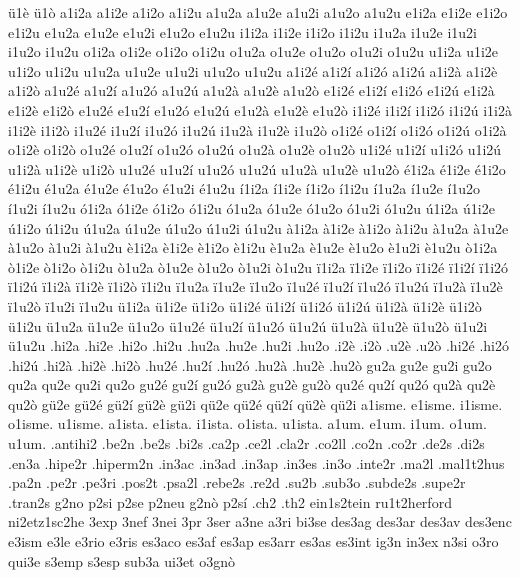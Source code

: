{ü1è ü1ò
%
a1i2a a1i2e a1i2o a1i2u
a1u2a a1u2e a1u2i a1u2o a1u2u
e1i2a e1i2e e1i2o e1i2u
e1u2a e1u2e e1u2i e1u2o e1u2u
i1i2a i1i2e i1i2o i1i2u
i1u2a i1u2e i1u2i i1u2o i1u2u
o1i2a o1i2e o1i2o o1i2u
o1u2a o1u2e o1u2o o1u2i o1u2u
u1i2a u1i2e u1i2o u1i2u
u1u2a u1u2e u1u2i u1u2o u1u2u
a1i2é a1i2í a1i2ó a1i2ú a1i2à
a1i2è a1i2ò
a1u2é a1u2í a1u2ó a1u2ú a1u2à
a1u2è a1u2ò
e1i2é e1i2í e1i2ó e1i2ú e1i2à
e1i2è e1i2ò
e1u2é e1u2í e1u2ó e1u2ú e1u2à
e1u2è e1u2ò
i1i2é i1i2í i1i2ó i1i2ú i1i2à
i1i2è i1i2ò
i1u2é i1u2í i1u2ó i1u2ú i1u2à
i1u2è i1u2ò
o1i2é o1i2í o1i2ó o1i2ú o1i2à
o1i2è o1i2ò
o1u2é o1u2í o1u2ó o1u2ú o1u2à
o1u2è o1u2ò
u1i2é u1i2í u1i2ó u1i2ú u1i2à
u1i2è u1i2ò
u1u2é u1u2í u1u2ó u1u2ú u1u2à
u1u2è u1u2ò
é1i2a é1i2e é1i2o é1i2u
é1u2a é1u2e é1u2o é1u2i é1u2u
í1i2a í1i2e í1i2o í1i2u
í1u2a í1u2e í1u2o í1u2i í1u2u
ó1i2a ó1i2e ó1i2o ó1i2u
ó1u2a ó1u2e ó1u2o ó1u2i ó1u2u
ú1i2a ú1i2e ú1i2o ú1i2u
ú1u2a ú1u2e ú1u2o ú1u2i ú1u2u
à1i2a à1i2e à1i2o à1i2u
à1u2a à1u2e à1u2o à1u2i à1u2u
è1i2a è1i2e è1i2o è1i2u
è1u2a è1u2e è1u2o è1u2i è1u2u
ò1i2a ò1i2e ò1i2o ò1i2u
ò1u2a ò1u2e ò1u2o ò1u2i ò1u2u
ï1i2a ï1i2e ï1i2o ï1i2é ï1i2í
ï1i2ó
ï1i2ú ï1i2à
ï1i2è ï1i2ò ï1i2u
ï1u2a ï1u2e ï1u2o ï1u2é ï1u2í
ï1u2ó
ï1u2ú ï1u2à
ï1u2è ï1u2ò ï1u2i ï1u2u
ü1i2a ü1i2e ü1i2o ü1i2é ü1i2í
ü1i2ó
ü1i2ú ü1i2à
ü1i2è ü1i2ò ü1i2u
ü1u2a ü1u2e ü1u2o ü1u2é ü1u2í
ü1u2ó
ü1u2ú ü1u2à
ü1u2è ü1u2ò ü1u2i ü1u2u
%
.hi2a .hi2e .hi2o .hi2u .hu2a .hu2e .hu2i .hu2o
.i2è .i2ò
.u2è .u2ò
.hi2é .hi2ó .hi2ú .hi2à .hi2è
.hi2ò
.hu2é .hu2í .hu2ó .hu2à .hu2è
.hu2ò
%
gu2a gu2e gu2i gu2o qu2a qu2e qu2i qu2o
gu2é gu2í gu2ó gu2à gu2è
gu2ò
qu2é qu2í qu2ó qu2à qu2è
qu2ò
gü2e gü2é gü2í gü2è gü2i
qü2e qü2é qü2í qü2è qü2i
%
a1isme. e1isme. i1isme. o1isme. u1isme.
a1ista. e1ista. i1ista. o1ista. u1ista.
a1um. e1um. i1um. o1um. u1um.
%
.antihi2 .be2n .be2s .bi2s .ca2p .ce2l .cla2r .co2ll .co2n .co2r .de2s
.di2s .en3a .hipe2r .hiperm2n .in3ac .in3ad .in3ap .in3es .in3o
.inte2r .ma2l .mal1t2hus .pa2n .pe2r .pe3ri .pos2t .psa2l .rebe2s
.re2d .su2b .sub3o .subde2s .supe2r .tran2s
%
g2no p2si p2se p2neu
g2nò p2sí
%
.ch2 .th2
ein1s2tein ru1t2herford ni2etz1sc2he
%
3exp 3nef 3nei 3pr 3ser a3ne a3ri bi3se des3ag des3ar des3av des3enc
e3ism e3le e3rio e3ris es3aco es3af es3ap es3arr es3as es3int
ig3n in3ex n3si o3ro qui3e s3emp s3esp sub3a ui3et
o3gnò
}
